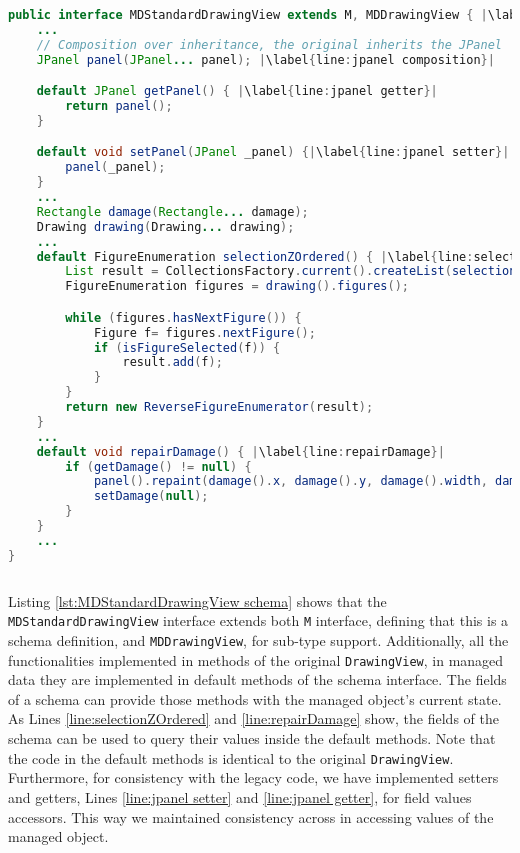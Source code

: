 \begin{sourcecode}[H]
	\begin{lstlisting}[language=Java, escapechar=|]
public interface MDStandardDrawingView extends M, MDDrawingView { |\label{line:MDStandardDrawingView extends M, MDDrawingView}|
	...
	// Composition over inheritance, the original inherits the JPanel
	JPanel panel(JPanel... panel); |\label{line:jpanel composition}|

	default JPanel getPanel() { |\label{line:jpanel getter}|
	    return panel();
	}

	default void setPanel(JPanel _panel) {|\label{line:jpanel setter}|
	    panel(_panel);
	}
	...
	Rectangle damage(Rectangle... damage);
	Drawing drawing(Drawing... drawing);
	...
	default FigureEnumeration selectionZOrdered() { |\label{line:selectionZOrdered}|
		List result = CollectionsFactory.current().createList(selectionCount());
		FigureEnumeration figures = drawing().figures();

		while (figures.hasNextFigure()) {
			Figure f= figures.nextFigure();
			if (isFigureSelected(f)) {
				result.add(f);
			}
		}
		return new ReverseFigureEnumerator(result);
	}
	...
	default void repairDamage() { |\label{line:repairDamage}|
		if (getDamage() != null) {
			panel().repaint(damage().x, damage().y, damage().width, damage().height);
			setDamage(null);
		}
	}
	...
}
	\end{lstlisting}
	\caption{MDStandardDrawingView schema}
	\label{lst:MDStandardDrawingView schema}
\end{sourcecode}

Listing \ref{lst:MDStandardDrawingView schema} shows that the \texttt{MDStandardDrawingView} interface extends both \texttt{M} interface, defining that this is a schema definition, and \texttt{MDDrawingView}, for sub-type support.
Additionally, all the functionalities implemented in methods of the original \texttt{DrawingView}, in managed data they are implemented in default methods of the schema interface.
The fields of a schema can provide those methods with the managed object's current state.
As Lines \ref{line:selectionZOrdered} and \ref{line:repairDamage} show, the fields of the schema can be used to query their values inside the default methods.
Note that the code in the default methods is identical to the original \texttt{DrawingView}.
Furthermore, for consistency with the legacy code, we have implemented setters and getters, Lines \ref{line:jpanel setter} and \ref{line:jpanel getter}, for field values accessors.
This way we maintained consistency across in accessing values of the managed object.

